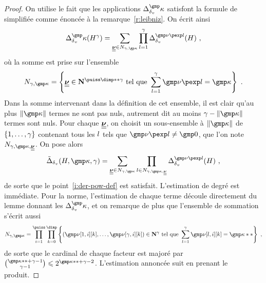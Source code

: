 \begin{proof}
  On utilise le fait que les applications \( \pmnum_\dv^\dermp \) satisfont la
  formule de  simplifiée comme énoncée à la
  remarque~\ref{r:leibniz}. On écrit ainsi
  \begin{equation}
    \pmnum_\dv^\dermp(H^\gamma)
    =
    \sum_{\gmmp\nu \in N_{\gamma, \derp}}
    \prod_{\indi = 1}^{\gamma}
    \pmnum_\dv^{ \gmp\nu\pexp\indi }(H)
    \pmm,
  \end{equation}
  où la somme est prise sur l'ensemble
  \begin{equation}
    N_{\gamma, \dermp} = \left\{
      \gmmp\nu \in \N^{\puiss\dimp**\gamma}
      \text{ tel que }
      \sum_{\indi = 1}^{\gamma} \gmp\nu\pexp\indi = \dermp
    \right\}
    \pmm.
  \end{equation}
  Dans la somme intervenant dans la définition de cet ensemble, il est clair
  qu'au plus \( \lgt\dermp \) termes ne sont pas nuls, autrement dit au moins
  \( \gamma - \lgt\dermp \) termes sont nuls. Pour chaque \( \underline{\underline{\boldsymbol{\nu}}} \), on
  choisit un sous-ensemble à \( \lgt\dermp \) de \( \lbrace1, \dots, \gamma\rbrace \)
  contenant tous les \( l \) tels que \( \gmp\nu\pexp\indi \neq \gmp 0 \),
  que l'on note \( N_{\gamma, \dermp, \gmmp\nu} \). On pose alors
  \begin{equation}
    \tilde\pmnum_\dv(H, \dermp, \gamma)
    =
    \sum_{\gmmp\nu \in N_{\gamma, \derp}}
    \prod_{\indi \in N_{\gamma, \dermp, \gmmp\nu}}
    \pmnum_\dv^{ \gmp\nu\pexp\indi }(H)
    \pmm,
  \end{equation}
  de sorte que le point~\ref{i:der-pow-def} est satisfait. L'estimation de
  degré est immédiate. Pour la norme, l'estimation de chaque terme découle
  directement du lemme donnant les \( \pmnum_\dv^\dermp \), et on remarque de
  plus que l'ensemble de sommation s'écrit aussi
  \begin{equation}
    N_{\gamma, \dermp} =
    \prod\fctrange \prod\indrange
    \left\{
      (\gmp\nu[1, \fct][\ind], \dots, \gmp\nu[\gamma, \fct][\ind])
      \in \N^\gamma
      \text{ tel que }
      \sum_{\indi = 1}^{\gamma} \gmp\nu[\indi, \fct][\ind] = \dermp**
    \right\}
    \pmm,
  \end{equation}
  de sorte que le cardinal de chaque facteur est majoré par \( \binom{\dermp**
      + \gamma - 1}{\gamma - 1} \le 2^{\dermp** + \gamma - 2} \). L'estimation
  annoncée suit en prenant le produit.
\end{proof}


\endinput

